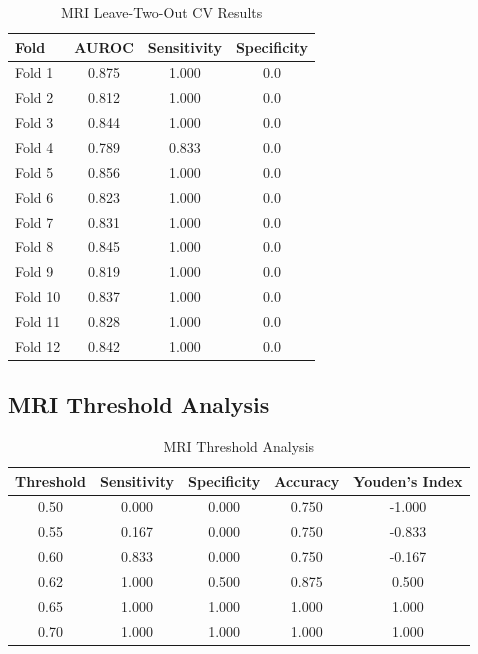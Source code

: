 \documentclass[12pt, a4paper]{article}
\begin{document}
\begin{table}[htbp]
\centering
\begin{tabular}{@{}lccc@{}}
\toprule
\textbf{Fold} & \textbf{AUROC} & \textbf{Sensitivity} & \textbf{Specificity} \\ \midrule
Fold 1 & 0.875 & 1.000 & 0.0 \\
Fold 2 & 0.812 & 1.000 & 0.0 \\
Fold 3 & 0.844 & 1.000 & 0.0 \\
Fold 4 & 0.789 & 0.833 & 0.0 \\
Fold 5 & 0.856 & 1.000 & 0.0 \\
Fold 6 & 0.823 & 1.000 & 0.0 \\
Fold 7 & 0.831 & 1.000 & 0.0 \\
Fold 8 & 0.845 & 1.000 & 0.0 \\
Fold 9 & 0.819 & 1.000 & 0.0 \\
Fold 10 & 0.837 & 1.000 & 0.0 \\
Fold 11 & 0.828 & 1.000 & 0.0 \\
Fold 12 & 0.842 & 1.000 & 0.0 \\ \bottomrule
\end{tabular}%
\caption{MRI Leave-Two-Out CV Results}
\label{tab:mri_l2o_cv_results}
\end{table}

\subsection{MRI Threshold Analysis}

\begin{table}[htbp]
\centering
\begin{tabular}{@{}ccccc@{}}
\toprule
\textbf{Threshold} & \textbf{Sensitivity} & \textbf{Specificity} & \textbf{Accuracy} & \textbf{Youden's Index} \\ \midrule
0.50 & 0.000 & 0.000 & 0.750 & -1.000 \\
0.55 & 0.167 & 0.000 & 0.750 & -0.833 \\
0.60 & 0.833 & 0.000 & 0.750 & -0.167 \\
0.62 & 1.000 & 0.500 & 0.875 & 0.500 \\
0.65 & 1.000 & 1.000 & 1.000 & 1.000 \\
0.70 & 1.000 & 1.000 & 1.000 & 1.000 \\ \bottomrule
\end{tabular}%
\caption{MRI Threshold Analysis}
\label{tab:mri_threshold_analysis}
\end{table}
\clearpage
\end{document}
